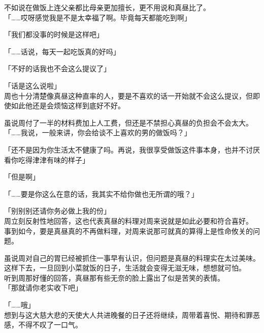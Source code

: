不如说在做饭上连父亲都比母亲更加擅长，更不用说和真昼比了。\\

「……哎呀感觉我是不是太幸福了啊。毕竟每天都能吃到啊」

「我们都没事的时候是这样吧」

「……话说，每天一起吃饭真的好吗」

「不好的话我也不会这么提议了」

「话是这么说啦」\\

周也十分清楚像真昼这种直率的人，要是不喜欢的话一开始就不会这么提议，但即使如此他还是会烦恼这样到底好不好。

虽说周付了一半的材料费加上人工费，但还是不禁担心真昼的负担会不会太大。\\

「……我说，一般来讲，你会给谈不上喜欢的男的做饭吗？」

「还不是因为你生活太不健康了吗。再说，我很享受做饭这件事本身，也并不讨厌看你吃得津津有味的样子」

「但是啊」

「……要是你这么在意的话，我其实不给你做也无所谓的哦？」

「别别别还请你务必做上我的份」\\

周立刻反射性地回答，这也代表真昼的料理对周来说就是如此必要和符合喜好。\\

事到如今，要是真昼真的不再做料理，对周来说那可就真的算得上是性命攸关的问题。

虽说周对自己的胃已经被抓住一事早有认识，但问题是真昼的料理实在太过美味。这样下去，一旦回到小菜就饭的日子，生活就会变得无滋无味，想想就可怕。\\

听到周那好懂的回答，真昼那有些无奈的脸上露出了似是苦笑的表情。\\

「那就请你老实收下吧」

「……哦」\\

想到与这大慈大悲的天使大人共进晚餐的日子还将继续，周带着喜悦、期待和罪恶感，不得不叹了一口气。
